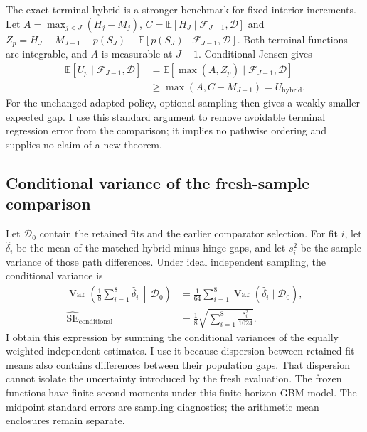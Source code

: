 \documentclass[11pt]{article}
\newcommand{\E}{\mathbb E}
\newcommand{\F}{\mathcal F}
\begin{document}
The exact-terminal hybrid is a stronger benchmark for fixed interior increments. Let $A=\max_{j<J}(H_j-M_j)$, $C=\E[H_J\mid\F_{J-1},\mathcal D]$ and $Z_p=H_J-M_{J-1}-p(S_J)+\E[p(S_J)\mid\F_{J-1},\mathcal D]$. Both terminal functions are integrable, and $A$ is measurable at $J-1$. Conditional Jensen gives
\begin{equation}
\begin{aligned}
 \E[U_p\mid\F_{J-1},\mathcal D]
 &=\E[\max(A,Z_p)\mid\F_{J-1},\mathcal D]\\
 &\geq\max(A,C-M_{J-1})=U_{\mathrm{hybrid}}.
\end{aligned}
\label{eq:hybridjensen}
\end{equation}
For the unchanged adapted policy, optional sampling then gives a weakly smaller expected gap. I use this standard argument to remove avoidable terminal regression error from the comparison; it implies no pathwise ordering and supplies no claim of a new theorem.

\subsection{Conditional variance of the fresh-sample comparison}
\label{app:conditional-variance}

Let $\mathcal D_0$ contain the retained fits and the earlier comparator selection. For fit $i$, let $\widehat\delta_i$ be the mean of the matched hybrid-minus-hinge gaps, and let $s_i^2$ be the sample variance of those path differences. Under ideal independent sampling, the conditional variance is
\begin{equation}
\begin{aligned}
 \operatorname{Var}\!\left(\frac18\sum_{i=1}^8\widehat\delta_i\,\middle|\,\mathcal D_0\right)
 &=\frac1{64}\sum_{i=1}^8\operatorname{Var}(\widehat\delta_i\mid\mathcal D_0),\\
 \widehat{\mathrm{SE}}_{\mathrm{conditional}}
 &=\frac18\sqrt{\sum_{i=1}^8\frac{s_i^2}{1024}}.
\end{aligned}
\label{eq:frozenvariance}
\end{equation}
I obtain this expression by summing the conditional variances of the equally weighted independent estimates. I use it because dispersion between retained fit means also contains differences between their population gaps. That dispersion cannot isolate the uncertainty introduced by the fresh evaluation. The frozen functions have finite second moments under this finite-horizon GBM model. The midpoint standard errors are sampling diagnostics; the arithmetic mean enclosures remain separate.
\end{document}
